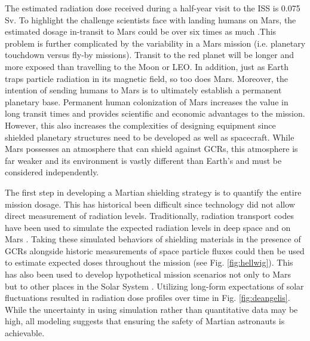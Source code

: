 The estimated radiation dose received during a half-year visit to the ISS is 0.075 Sv. To highlight the challenge scientists face with landing humans on Mars, the estimated dosage in-transit to Mars could be over six times as much \cite{kerr-mars}.This problem is further complicated by the variability in a Mars mission (i.e. planetary touchdown versus fly-by missions). Transit to the red planet will be longer and more exposed than travelling to the Moon or LEO. In addition, just as Earth traps particle radiation in its magnetic field, so too does Mars. Moreover, the intention of sending humans to Mars is to ultimately establish a permanent planetary base. Permanent human colonization of Mars increases the value in long transit times and provides scientific and economic advantages to the mission. However, this also increases the complexities of designing equipment since shielded planetary structures need to be developed as well as spacecraft. While Mars possesses an atmosphere that can shield against GCRs, this atmosphere is far weaker and its environment is vastly different than Earth’s and must be considered independently.

The first step in developing a Martian shielding strategy is to quantify the entire mission dosage. This has historical been difficult since technology did not allow direct measurement of radiation levels. Traditionally, radiation transport codes have been used to simulate the expected radiation levels in deep space and on Mars \cite{simonsen-transport}. Taking these simulated behaviors of shielding materials in the presence of GCRs alongside historic measurements of space particle fluxes could then be used to estimate expected doses throughout the mission (see Fig. \ref{fig:hellwig}). This has also been used to develop hypothetical mission scenarios not only to Mars but to other places in the Solar System \cite{deangelis-scenarios}. Utilizing long-form expectations of solar fluctuations resulted in radiation dose profiles over time in Fig. \ref{fig:deangelis}. While the uncertainty in using simulation rather than quantitative data may be high, all modeling suggests that ensuring the safety of Martian astronauts is achievable.

